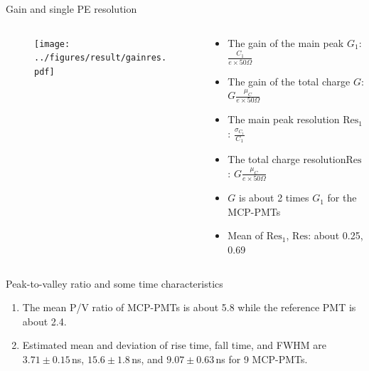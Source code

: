 \documentclass[aspectratio=169]{beamer}
\begin{document}
\begin{frame}{Gain and single PE resolution}
    \begin{columns}
        \begin{column}{0.38\textwidth}
            \begin{figure}
                \texttt{[image: ../figures/result/gainres.pdf]}    
            \end{figure}
        \end{column}
        \begin{column}{0.6\textwidth}
            \begin{itemize}
                \item The gain of the main peak $G_1$: $\frac{C_1}{e\times 50\Omega}$
                \item The gain of the total charge $G$: $G\frac{\mu_{C}}{e\times 50\Omega}$
                \item The main peak resolution $\mathrm{Res}_1$: $\frac{\sigma_{C_1}}{C_1}$
                \item The total charge resolution$\mathrm{Res}$: $G\frac{\mu_{C}}{e\times 50\Omega}$
            \end{itemize}

            \begin{itemize}
                \item $G$ is about 2 times $G_1$ for the MCP-PMTs
                \item Mean of $\mathrm{Res}_1$, $\mathrm{Res}$: about 0.25, 0.69
            \end{itemize}
        \end{column}
    \end{columns}
    \begin{block}{Peak-to-valley ratio and some time characteristics}
        \begin{enumerate}
            \item The mean P/V ratio of MCP-PMTs is about 5.8 while the reference PMT is about 2.4.
            \item Estimated mean and deviation of rise time, fall time, and FWHM are $3.71\pm0.15$\,ns, $15.6\pm1.8$\,ns, and $9.07\pm0.63$\,ns for 9 MCP-PMTs.
        \end{enumerate}
    \end{block}
\end{frame}
\end{document}
